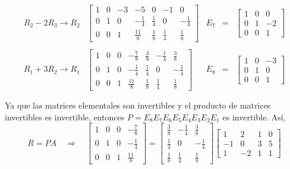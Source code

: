 \begin{enumerate}[\bfseries 1.]
	$$
	\begin{array}{rlrcl}
	    R_2-2R_3\to R_2&
	    \left[
		\begin{array}{rrrr|rrr}
		    1 & 0 & -3 & -5 & 0 & -1 & 0 \\
		    0 & 1 & 0 & -\frac{1}{4} & \frac{1}{4} & 0 & -\frac{1}{4} \\
		    0 & 0 & 1 & \frac{11}{8} & \frac{1}{8} & \frac{1}{4} & \frac{1}{8}
		\end{array}
	    \right]
	    &E_7&=&
	    \left[
		\begin{array}{rrr}
		    1&0&0\\
		    0&1&-2\\
		    0&0&1
		\end{array}
	    \right]\\\\
	    R_1+3R_2\to R_1&
	    \left[
		\begin{array}{rrrr|rrr}
		    1 & 0 & 0 & -\frac{7}{8} & \frac{3}{8} & -\frac{1}{4} & \frac{3}{8} \\
		    0 & 1 & 0 & -\frac{1}{4} & \frac{1}{4} & 0 & -\frac{1}{4} \\
		    0 & 0 & 1 & \frac{11}{8} & \frac{1}{8} & \frac{1}{4} & \frac{1}{8}
		\end{array}
	    \right]
	    &E_8&=&
	    \left[
		\begin{array}{rrr}
		    1&0&-3\\
		    0&1&0\\
		    0&0&1
		\end{array}
	    \right]\\\\
	\end{array}
	$$
	Ya que las matrices elementales son invertibles y el producto de matrices invertibles es invertible, entonces $P=E_8 E_7 E_6 E_5 E_4 E_3 E_2 E_1$ es invertible.
	Así,
	$$
	R=PA \quad \Rightarrow \quad
	\left[
	    \begin{array}{rrrr}
		1 & 0 & 0 & -\frac{7}{8} \\
		0 & 1 & 0 & -\frac{1}{4} \\
		0 & 0 & 1 & \frac{11}{8} 
	    \end{array}
	\right]
	=
	\left[
	    \begin{array}{rrr}
		\frac{3}{8} & -\frac{1}{4} & \frac{3}{8} \\
		\frac{1}{4} & 0 & -\frac{1}{4} \\
		\frac{1}{8} & \frac{1}{4} & \frac{1}{8}
	    \end{array}
	\right]
	\left[
	    \begin{array}{*{4}{r}}
		1 & 2 & 1 & 0 \\
		-1 & 0 & 3 & 5 \\
		1 & -2 & 1 & 1
	    \end{array}
	\right]
	$$
	\vspace{.5cm}


\end{enumerate}

